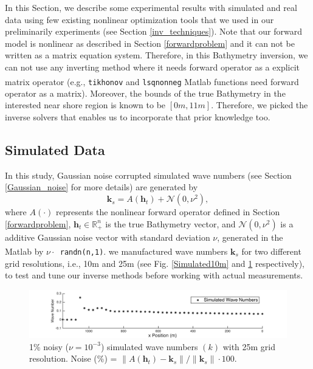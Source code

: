 
In this Section, we describe some experimental results with simulated and real data using few existing nonlinear optimization tools that we used in our preliminarily experiments (see Section \ref{inv_techniques}). Note that our forward model is nonlinear as described in Section \ref{forwardproblem} and it can not be written as a matrix equation system. Therefore, in this Bathymetry inversion, we can not use any inverting method where it needs forward operator as a explicit matrix operator (e.g., \verb|tikhonov| and  \verb|lsqnonneg|     
 Matlab\textsuperscript{\textregistered} functions need forward operator as a matrix). Moreover, the bounds of the true Bathymetry in the interested near shore region is known to be $[0m, 11m]$. Therefore, we picked the inverse solvers that enables us to incorporate that prior knowledge too. 

\subsection{Simulated Data}
In this study, Gaussian noise corrupted simulated wave numbers (see Section \ref{Gaussian_noise} for more details) are generated by 
\begin{equation}
\mathbf{k}_s = A(\mathbf{h}_t) + \mathcal{N}(0, \nu^2),
\end{equation}
where $A(\cdot)$ represents the nonlinear forward operator defined in Section \ref{forwardproblem}, $\mathbf{h}_t \in \mathbb{R}_+^n$ is the true Bathymetry vector, and $\mathcal{N}(0, \nu^2)$ is a additive Gaussian noise vector with standard deviation $\nu$, generated in the Matlab\textsuperscript{\textregistered} by $\nu \cdot $\verb| randn(n,1)|. we manufactured wave numbers $\mathbf{k}_s$ for two different grid resolutions, i.e., 10m and 25m (see Fig. \ref{Simulated10m} and \ref{Simulated25m} respectively), to test and tune our inverse methods before working with actual measurements. 



\begin{figure}[H]
\center
\includegraphics[scale=0.6]{img/simulated_data_k25m.png} 
\caption{1\% noisy ($\nu = 10^{-3}$) simulated wave numbers $(k)$ with 25m grid resolution. Noise (\%) = $\|A(\mathbf{h}_t) -  \mathbf{k}_s\| / \|  \mathbf{k}_s \| \cdot 100$.}
\label{Simulated25m}
\end{figure}

